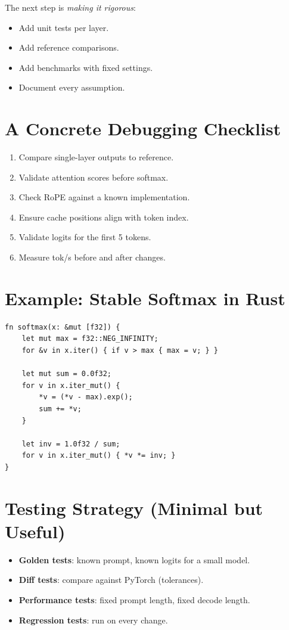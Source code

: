 \documentclass[11pt]{article}
\begin{document}
The next step is \emph{making it rigorous}:
\begin{itemize}
  \item Add unit tests per layer.
  \item Add reference comparisons.
  \item Add benchmarks with fixed settings.
  \item Document every assumption.
\end{itemize}

\section{A Concrete Debugging Checklist}
\begin{enumerate}
  \item Compare single-layer outputs to reference.
  \item Validate attention scores before softmax.
  \item Check RoPE against a known implementation.
  \item Ensure cache positions align with token index.
  \item Validate logits for the first 5 tokens.
  \item Measure tok/s before and after changes.
\end{enumerate}

\section{Example: Stable Softmax in Rust}
\begin{lstlisting}
fn softmax(x: &mut [f32]) {
    let mut max = f32::NEG_INFINITY;
    for &v in x.iter() { if v > max { max = v; } }

    let mut sum = 0.0f32;
    for v in x.iter_mut() {
        *v = (*v - max).exp();
        sum += *v;
    }

    let inv = 1.0f32 / sum;
    for v in x.iter_mut() { *v *= inv; }
}
\end{lstlisting}

\section{Testing Strategy (Minimal but Useful)}
\begin{itemize}
  \item \textbf{Golden tests}: known prompt, known logits for a small model.
  \item \textbf{Diff tests}: compare against PyTorch (tolerances).
  \item \textbf{Performance tests}: fixed prompt length, fixed decode length.
  \item \textbf{Regression tests}: run on every change.
\end{itemize}
\end{document}

